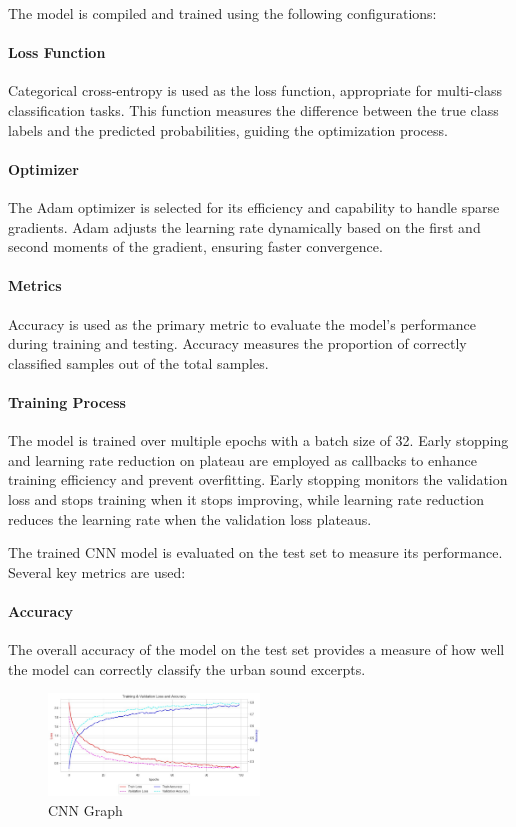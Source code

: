 \documentclass[conference]{IEEEtran}
\begin{document}
The model is compiled and trained using the following configurations:

\paragraph{Loss Function}
Categorical cross-entropy is used as the loss function, appropriate for multi-class classification tasks. This function measures the difference between the true class labels and the predicted probabilities, guiding the optimization process.

\paragraph{Optimizer}
The Adam optimizer is selected for its efficiency and capability to handle sparse gradients. Adam adjusts the learning rate dynamically based on the first and second moments of the gradient, ensuring faster convergence.

\paragraph{Metrics}
Accuracy is used as the primary metric to evaluate the model's performance during training and testing. Accuracy measures the proportion of correctly classified samples out of the total samples.

\paragraph{Training Process}
The model is trained over multiple epochs with a batch size of 32. Early stopping and learning rate reduction on plateau are employed as callbacks to enhance training efficiency and prevent overfitting. Early stopping monitors the validation loss and stops training when it stops improving, while learning rate reduction reduces the learning rate when the validation loss plateaus.

The trained CNN model is evaluated on the test set to measure its performance. Several key metrics are used:

\paragraph{Accuracy}
The overall accuracy of the model on the test set provides a measure of how well the model can correctly classify the urban sound excerpts.

\begin{figure}[htbp]
\centerline{\includegraphics[width=0.5\textwidth]{Images/CNNgraph.png}}
\caption{CNN Graph}
\label{fig:LSTMconfusion}
\end{figure}
\end{document}
